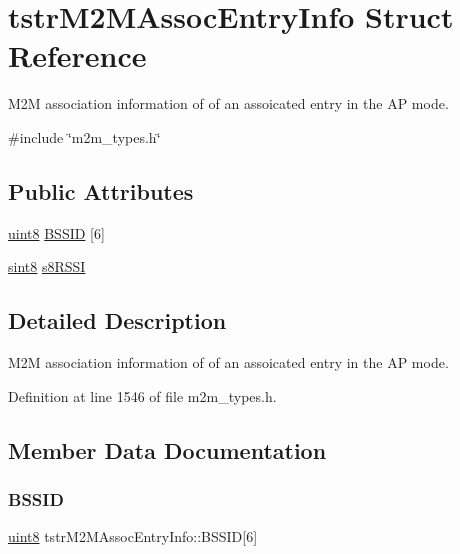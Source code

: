 \hypertarget{structtstrM2MAssocEntryInfo}{}\section{tstr\+M2\+M\+Assoc\+Entry\+Info Struct Reference}
\label{structtstrM2MAssocEntryInfo}


M2M association information of of an assoicated entry in the AP mode.  




{\ttfamily \#include \char`\"{}m2m\+\_\+types.\+h\char`\"{}}

\subsection*{Public Attributes}
\begin{DoxyCompactItemize}
\item 
\hyperlink{group__DataT_ga4df709a77647e870bbf1d955b8edc9a6}{uint8} \hyperlink{structtstrM2MAssocEntryInfo_a85752c1bbc4407f1a7d98da273e132a3}{B\+S\+S\+ID} \mbox{[}6\mbox{]}
\item 
\hyperlink{group__DataT_gae35f10ffd0ac8dd2bc3e794da9bdfbc7}{sint8} \hyperlink{structtstrM2MAssocEntryInfo_a5483d51e0b6af2ecbc83870fab1bb508}{s8\+R\+S\+SI}
\end{DoxyCompactItemize}


\subsection{Detailed Description}
M2M association information of of an assoicated entry in the AP mode. 

Definition at line 1546 of file m2m\+\_\+types.\+h.



\subsection{Member Data Documentation}
\mbox{\label{structtstrM2MAssocEntryInfo_a85752c1bbc4407f1a7d98da273e132a3}} 
\subsubsection{\texorpdfstring{B\+S\+S\+ID}{BSSID}}
{\footnotesize\ttfamily \hyperlink{group__DataT_ga4df709a77647e870bbf1d955b8edc9a6}{uint8} tstr\+M2\+M\+Assoc\+Entry\+Info\+::\+B\+S\+S\+ID\mbox{[}6\mbox{]}}

